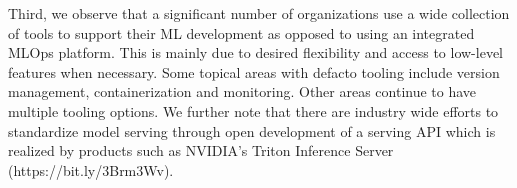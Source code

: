 

Third, we observe that a significant number of organizations use a wide collection of tools to support their ML development as opposed to using an integrated MLOps platform. This is mainly due to desired flexibility and access to low-level features when necessary. Some topical areas with defacto tooling include version management, containerization and monitoring. Other areas continue to have multiple tooling options. We further note that there are industry wide efforts to standardize model serving through open development of a serving API which is realized by products such as NVIDIA's Triton Inference Server (https://bit.ly/3Brm3Wv).



